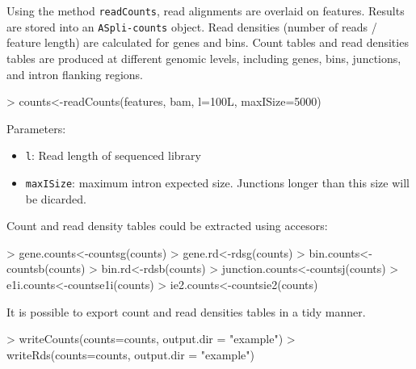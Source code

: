 \documentclass{article}
\begin{document}
Using the method \texttt{readCounts}, read alignments are overlaid on features. Results are stored into an \texttt{ASpli-counts} object. Read densities (number of reads / feature length) are calculated for genes and bins.
Count tables and read densities tables are produced at different genomic levels, including genes, bins, junctions, and intron flanking regions. 

\begin{Schunk}
\begin{Sinput}
> counts<-readCounts(features, bam, l=100L, maxISize=5000)
\end{Sinput}
\end{Schunk}

Parameters:
\begin{itemize}
\item \texttt{l}: Read length of sequenced library 
\item \texttt{maxISize}: maximum intron expected size. Junctions longer than this size will be dicarded. \cite{Hong01122006}
\end{itemize}

Count and read density tables could be extracted using accesors:
\begin{Schunk}
\begin{Sinput}
> gene.counts<-countsg(counts)
> gene.rd<-rdsg(counts)
> bin.counts<-countsb(counts)
> bin.rd<-rdsb(counts)
> junction.counts<-countsj(counts)
> e1i.counts<-countse1i(counts)
> ie2.counts<-countsie2(counts)
\end{Sinput}
\end{Schunk}
It is possible to export count and read densities tables in a tidy manner.
\begin{Schunk}
\begin{Sinput}
> writeCounts(counts=counts, output.dir = "example")
> writeRds(counts=counts, output.dir = "example")
\end{Sinput}
\end{Schunk}
\end{document}
